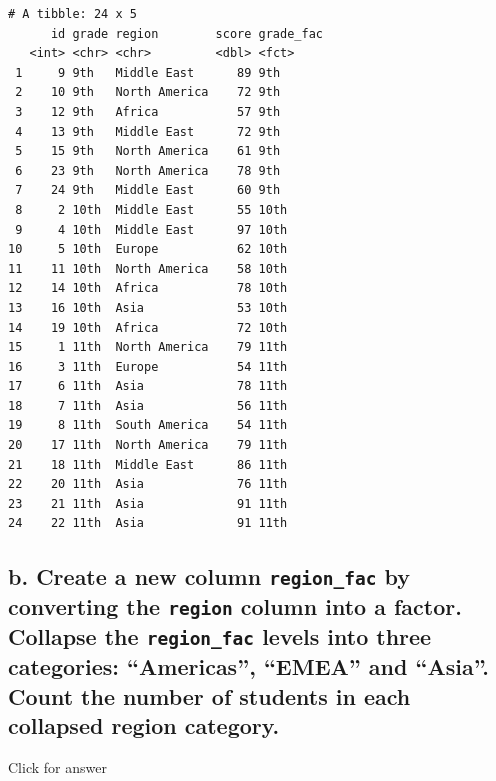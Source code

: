 \documentclass[
]{book}
\begin{document}
\begin{verbatim}
# A tibble: 24 x 5
      id grade region        score grade_fac
   <int> <chr> <chr>         <dbl> <fct>    
 1     9 9th   Middle East      89 9th      
 2    10 9th   North America    72 9th      
 3    12 9th   Africa           57 9th      
 4    13 9th   Middle East      72 9th      
 5    15 9th   North America    61 9th      
 6    23 9th   North America    78 9th      
 7    24 9th   Middle East      60 9th      
 8     2 10th  Middle East      55 10th     
 9     4 10th  Middle East      97 10th     
10     5 10th  Europe           62 10th     
11    11 10th  North America    58 10th     
12    14 10th  Africa           78 10th     
13    16 10th  Asia             53 10th     
14    19 10th  Africa           72 10th     
15     1 11th  North America    79 11th     
16     3 11th  Europe           54 11th     
17     6 11th  Asia             78 11th     
18     7 11th  Asia             56 11th     
19     8 11th  South America    54 11th     
20    17 11th  North America    79 11th     
21    18 11th  Middle East      86 11th     
22    20 11th  Asia             76 11th     
23    21 11th  Asia             91 11th     
24    22 11th  Asia             91 11th     
\end{verbatim}

\hypertarget{b.-create-a-new-column-region_fac-by-converting-the-region-column-into-a-factor.-collapse-the-region_fac-levels-into-three-categories-americas-emea-and-asia.-count-the-number-of-students-in-each-collapsed-region-category.}{%
\subsection{\texorpdfstring{b. Create a new column \texttt{region\_fac} by converting the \texttt{region} column into a factor. Collapse the \texttt{region\_fac} levels into three categories: ``Americas'', ``EMEA'' and ``Asia''. Count the number of students in each collapsed region category.}{b. Create a new column region\_fac by converting the region column into a factor. Collapse the region\_fac levels into three categories: ``Americas'', ``EMEA'' and ``Asia''. Count the number of students in each collapsed region category.}}\label{b.-create-a-new-column-region_fac-by-converting-the-region-column-into-a-factor.-collapse-the-region_fac-levels-into-three-categories-americas-emea-and-asia.-count-the-number-of-students-in-each-collapsed-region-category.}}

Click for answer
\end{document}

